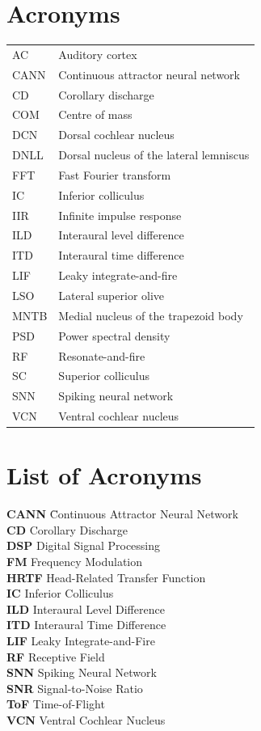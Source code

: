 \documentclass[12pt,a4paper]{report}
\begin{document}
\chapter*{Acronyms}
\begin{tabular}{ll}
  AC & Auditory cortex\\
  CANN & Continuous attractor neural network\\
  CD & Corollary discharge\\
  COM & Centre of mass\\
  DCN & Dorsal cochlear nucleus\\
  DNLL & Dorsal nucleus of the lateral lemniscus\\
  FFT & Fast Fourier transform\\
  IC & Inferior colliculus\\
  IIR & Infinite impulse response\\
  ILD & Interaural level difference\\
  ITD & Interaural time difference\\
  LIF & Leaky integrate-and-fire\\
  LSO & Lateral superior olive\\
  MNTB & Medial nucleus of the trapezoid body\\
  PSD & Power spectral density\\
  RF & Resonate-and-fire\\
  SC & Superior colliculus\\
  SNN & Spiking neural network\\
  VCN & Ventral cochlear nucleus
\end{tabular}

\chapter*{List of Acronyms}

\begin{tabbing}
    \textbf{CANN} \qquad \= Continuous Attractor Neural Network \\
    \textbf{CD} \> Corollary Discharge \\
    \textbf{DSP} \> Digital Signal Processing \\
    \textbf{FM} \> Frequency Modulation \\
    \textbf{HRTF} \> Head-Related Transfer Function \\
    \textbf{IC} \> Inferior Colliculus \\
    \textbf{ILD} \> Interaural Level Difference \\
    \textbf{ITD} \> Interaural Time Difference \\
    \textbf{LIF} \> Leaky Integrate-and-Fire \\
    \textbf{RF} \> Receptive Field \\
    \textbf{SNN} \> Spiking Neural Network \\
    \textbf{SNR} \> Signal-to-Noise Ratio \\
    \textbf{ToF} \> Time-of-Flight \\
    \textbf{VCN} \> Ventral Cochlear Nucleus
\end{tabbing}
\end{document}
